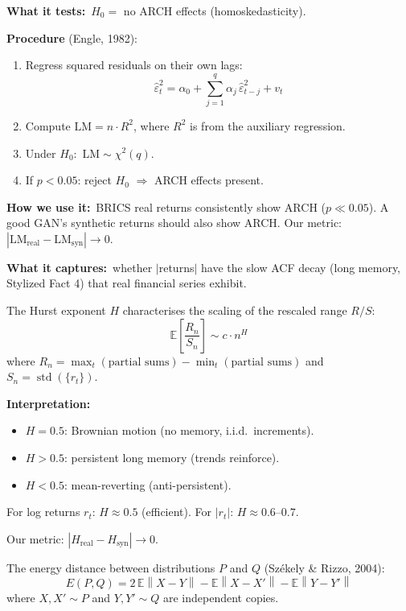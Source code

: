 \documentclass[10pt]{article}
\newcommand{\skybox}[2]{\begin{tcolorbox}[mybox={Sky}{BBg},title={#1}]#2\end{tcolorbox}}
\newcommand{\redbox}[2]{\begin{tcolorbox}[mybox={DRed}{RBg},title={#1}]#2\end{tcolorbox}}
\newcommand{\purplebox}[2]{\begin{tcolorbox}[mybox={Purple}{LBg},title={#1}]#2\end{tcolorbox}}
\newcommand{\E}{\mathbb{E}}
\newcommand{\norm}[1]{\left\|#1\right\|}
\begin{document}
\begin{multicols}{2}

\redbox{1.\ ARCH-LM Test --- Volatility Clustering}{%
\textbf{What it tests:}\ $H_0 =$ no ARCH effects (homoskedasticity).

\textbf{Procedure} (Engle, 1982):
\begin{enumerate}
  \item Regress squared residuals on their own lags:
        \[\hat{\varepsilon}^2_t = \alpha_0 + \sum_{j=1}^q \alpha_j\,\hat{\varepsilon}^2_{t-j} + v_t\]
  \item Compute $\text{LM} = n \cdot R^2$, where $R^2$ is from the auxiliary regression.
  \item Under $H_0$:\ $\text{LM} \sim \chi^2(q)$.
  \item If $p < 0.05$: reject $H_0$ $\Rightarrow$ ARCH effects present.
\end{enumerate}

\textbf{How we use it:}\ BRICS real returns consistently show ARCH ($p \ll 0.05$). A good GAN's synthetic returns should also show ARCH. Our metric: $|\text{LM}_\text{real} - \text{LM}_\text{syn}| \to 0$.}

\purplebox{2.\ Hurst Exponent --- Long Memory}{%
\textbf{What it captures:}\ whether $|$returns$|$ have the slow ACF decay (long memory, Stylized Fact 4) that real financial series exhibit.

The Hurst exponent $H$ characterises the scaling of the rescaled range $R/S$:
\begin{equation*}
  \E\!\left[\frac{R_n}{S_n}\right] \sim c \cdot n^H
\end{equation*}
where $R_n = \max_t(\text{partial sums}) - \min_t(\text{partial sums})$ and $S_n = \operatorname{std}(\{r_t\})$.

\textbf{Interpretation:}
\begin{itemize}
  \item $H = 0.5$: Brownian motion (no memory, i.i.d.\ increments).
  \item $H > 0.5$: persistent long memory (trends reinforce).
  \item $H < 0.5$: mean-reverting (anti-persistent).
\end{itemize}
For log returns $r_t$: $H \approx 0.5$ (efficient). For $|r_t|$: $H \approx 0.6$--$0.7$.

Our metric: $|H_\text{real} - H_\text{syn}| \to 0$.}

\columnbreak

\skybox{3.\ Energy Distance --- A Proper Distributional Metric}{%
The energy distance between distributions $P$ and $Q$ (Sz\'{e}kely \& Rizzo, 2004):
\begin{equation*}
  E(P,Q) = 2\,\E\norm{X - Y} - \E\norm{X - X'} - \E\norm{Y - Y'}
\end{equation*}
where $X, X' \sim P$ and $Y, Y' \sim Q$ are independent copies.

}
\end{multicols}
\end{document}
